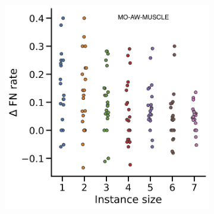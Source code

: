 \begin{figure}[!htbp]
\begin{adjustwidth}{-1.2cm}{}
		\begin{subfigure}{0.40\textwidth} \includegraphics[width=\textwidth]{Figure/delta4-momuscle.png} 
		\end{subfigure}
		

\end{adjustwidth}
\end{figure}

